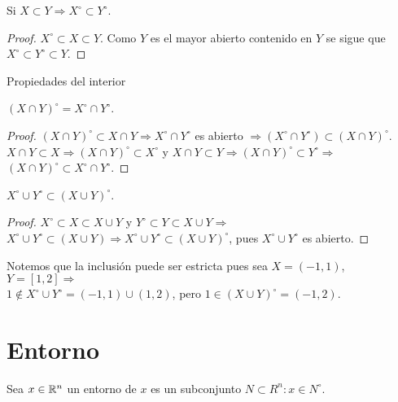 \begin{corollary}
  Si $X \subset Y \Rightarrow X^{\circ} \subset Y^{\circ}$.
  \begin{proof}
    $X^{\circ} \subset X \subset Y$. Como $Y$ es el mayor abierto contenido en $Y$ se sigue que $X^{\circ} \subset Y^{\circ} \subset Y$.
  \end{proof}
\end{corollary}

Propiedades del interior

\begin{prop}
  $(X \cap Y)^{\circ} = X^{\circ} \cap Y^{\circ}$.
  \begin{proof}
    $(X \cap Y)^{\circ} \subset X \cap Y \Rightarrow X^{\circ} \cap Y^{\circ}$ es abierto $\Rightarrow (X^{\circ} \cap Y^{\circ}) \subset (X \cap Y)^{\circ}$. \\
    $X \cap Y \subset X \Rightarrow (X \cap Y)^{\circ} \subset X^{\circ}$ y $X \cap Y \subset Y \Rightarrow (X \cap Y)^{\circ} \subset Y^{\circ} \Rightarrow$ \\
    $(X \cap Y)^{\circ} \subset X^{\circ} \cap Y^{\circ}$.
  \end{proof}
\end{prop}

\begin{prop}
  $X^{\circ} \cup Y^{\circ} \subset (X \cup Y)^{\circ}$.
  \begin{proof}
    $X^{\circ} \subset X \subset X \cup Y$ y $Y^{\circ} \subset Y \subset X \cup Y \Rightarrow$ \\
    $X^{\circ} \cup Y^{\circ} \subset (X \cup Y) \Rightarrow X^{\circ} \cup Y^{\circ} \subset (X \cup Y)^{\circ}$, pues $X^{\circ} \cup Y^{\circ}$ es abierto.
  \end{proof}
\end{prop}

Notemos que la inclusión puede ser estricta pues sea $X = (-1, 1)$, $Y = [1, 2] \Rightarrow$ \\
$1 \notin X^{\circ} \cup Y^{\circ} = (-1, 1) \cup (1, 2)$, pero $1 \in (X \cup Y)^{\circ} = (-1, 2)$.

\section{Entorno}

\begin{definition}[Entorno]
  Sea $x \in \mathbb{R}^n$ un entorno de $x$ es un subconjunto $N \subset R^n : x \in N^{\circ}$.
\end{definition}

